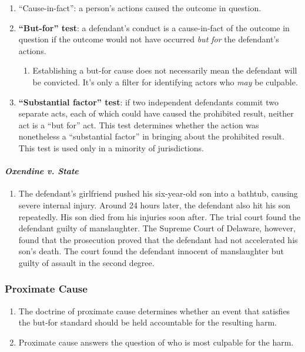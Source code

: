 \begin{enumerate}
    \item ``Cause-in-fact'': a person's actions caused the outcome in question.
    \item \textbf{``But-for'' test}: a defendant's conduct is a cause-in-fact of the outcome in question if the outcome would not have occurred \emph{but for} the defendant's actions.
    \begin{enumerate}
        \item Establishing a but-for cause does not necessarily mean the defendant will be convicted. It's only a filter for identifying actors who \emph{may} be culpable.
    \end{enumerate}
    \item \textbf{``Substantial factor'' test}: if two independent defendants commit two separate acts, each of which could have caused the prohibited result, neither act is a ``but for'' act. This test determines whether the action was nonetheless a ``substantial factor'' in bringing about the prohibited result. This test is used only in a minority of jurisdictions.
\end{enumerate}

\paragraph{\emph{Oxendine v. State}}

\begin{enumerate}
    \item The defendant's girlfriend pushed his six-year-old son into a bathtub, causing severe internal injury. Around 24 hours later, the defendant also hit his son repeatedly. His son died from his injuries soon after. The trial court found the defendant guilty of manslaughter. The Supreme Court of Delaware, however, found that the prosecution proved that the defendant had not accelerated his son's death. The court found the defendant innocent of manslaughter but guilty of assault in the second degree.
\end{enumerate}

\subsubsection{Proximate Cause} 

\begin{enumerate}
    \item The doctrine of proximate cause determines whether an event that satisfies the but-for standard should be held accountable for the resulting harm.
    \item Proximate cause answers the question of who is most culpable for the harm.
\end{enumerate}

